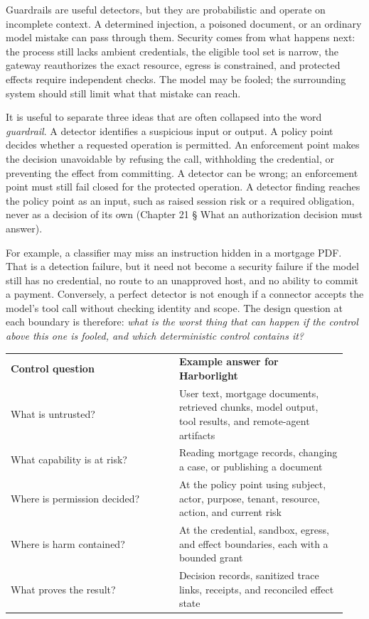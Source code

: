 Guardrails are useful detectors, but they are probabilistic and operate on incomplete context. A determined injection, a poisoned document, or an ordinary model mistake can pass through them. Security comes from what happens next: the process still lacks ambient credentials, the eligible tool set is narrow, the gateway reauthorizes the exact resource, egress is constrained, and protected effects require independent checks. The model may be fooled; the surrounding system should still limit what that mistake can reach.\par

It is useful to separate three ideas that are often collapsed into the word \emph{guardrail}. A detector identifies a suspicious input or output. A policy point decides whether a requested operation is permitted. An enforcement point makes the decision unavoidable by refusing the call, withholding the credential, or preventing the effect from committing. A detector can be wrong; an enforcement point must still fail closed for the protected operation. A detector finding reaches the policy point as an input, such as raised session risk or a required obligation, never as a decision of its own (Chapter 21 § What an authorization decision must answer).\par

For example, a classifier may miss an instruction hidden in a mortgage PDF. That is a detection failure, but it need not become a security failure if the model still has no credential, no route to an unapproved host, and no ability to commit a payment. Conversely, a perfect detector is not enough if a connector accepts the model's tool call without checking identity and scope. The design question at each boundary is therefore: \emph{what is the worst thing that can happen if the control above this one is fooled, and which deterministic control contains it?}\par

\BookTableStart
\small
\begin{tabular}{@{}Y{0.4700\linewidth}Y{0.4700\linewidth}@{}}
\color{white}\bfseries \textbf{Control question} & \color{white}\bfseries \textbf{Example answer for Harborlight} \\
What is untrusted? & User text, mortgage documents, retrieved chunks, model output, tool results, and remote-agent artifacts \\
What capability is at risk? & Reading mortgage records, changing a case, or publishing a document \\
Where is permission decided? & At the policy point using subject, actor, purpose, tenant, resource, action, and current risk \\
Where is harm contained? & At the credential, sandbox, egress, and effect boundaries, each with a bounded grant \\
What proves the result? & Decision records, sanitized trace links, receipts, and reconciled effect state \\
\end{tabular}
\BookTableEnd

